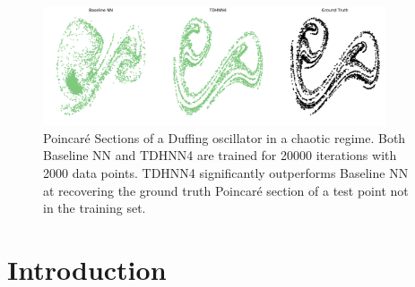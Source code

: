 \documentclass{article}
\begin{document}
\begin{abstract}
Learning the dynamics of complex physical systems requires models with well-chosen inductive biases. Recently, it was shown that neural networks designed to learn a Hamiltonian and exploit Hamilton's equations significantly outperform existing approaches in predicting trajectories of autonomous systems that depend implicitly on time. Despite this success, many real world physical systems are non-autonomous and depend explicitly on time. In this paper, we address this challenge by embedding a modified Port-Hamiltonian into our neural networks that extends the general Hamiltonian to capture damped and forced systems alike. We show that our network can learn the dynamics of complex physical systems such as a damped and driven oscillator, the Duffing equation in the chaotic regime, as well as a forced relativistic particle in a potential well. In all these settings, we show that our network can not only outperform existing baselines but can also accurately recover the underlying Hamiltonian, force and damping terms. We are also able to show that our network can be used to study the chaotic Duffing equation for long periodic trajectories and visually recover its Poincar\'e section - a crucial map in identifying chaotic trajectories. 
\end{abstract}

\begin{figure}[ht!]
\centering
\includegraphics[width=0.9\textwidth]{figures/main_fig.pdf}
\caption{Poincar\'e Sections of a Duffing oscillator in a chaotic regime. Both Baseline NN and TDHNN4 are trained for 20000 iterations with 2000 data points. TDHNN4 significantly outperforms Baseline NN at recovering the ground truth Poincar\'e section of a test point not in the training set.}
\label{fig.chaos1}
\end{figure}

\section{Introduction}
\end{document}
